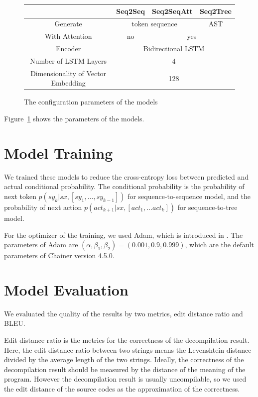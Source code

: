 \documentclass[senior,final,11pt]{iscs-thesis}
\begin{document}
\begin{figure}[h]
	\begin{tabular}{|c||c|c|c|}
		\hline
		  & Seq2Seq & Seq2SeqAtt & Seq2Tree \\ \hline \hline
		 Generate & \multicolumn{2}{|c|}{token sequence} & AST \\ \hline
		 With Attention & no & \multicolumn{2}{|c|}{yes} \\ \hline
		 Encoder & \multicolumn{3}{|c|}{Bidirectional LSTM} \\ \hline
		Number of LSTM Layers & \multicolumn{3}{|c|}{4} \\ \hline
		Dimensionality of Vector Embedding & \multicolumn{3}{|c|}{128} \\ \hline
	\end{tabular}
	\caption{The configuration parameters of the models}
	\label{fig:parameterofmodels}
\end{figure}

Figure~\ref{fig:parameterofmodels} shows the parameters of the models. 


\section{Model Training}
We trained these models to reduce the cross-entropy loss between predicted and actual conditional probability.
The conditional probability is the probability of next token $ p(sy_k|sx,[sy_1,\dots,sy_{k-1}]) $ for sequence-to-sequence model, 
and the probability of next action $p(act_{k+1}|sx,[act_1, \dots act_{k}]) $ for sequence-to-tree model.

For the optimizer of the training, we used Adam, which is introduced in \cite{Adam}.
The parameters of Adam are $ (\alpha,\beta_1,\beta_2) = (0.001,0.9,0.999) $, which are the default parameters of Chainer version 4.5.0.

\section{Model Evaluation}
We evaluated the quality of the results by two metrics, edit distance ratio and BLEU.

Edit distance ratio is the metrics for the correctness of the decompilation result.
Here, the edit distance ratio between two strings means the Levenshtein distance divided by the average length of the two strings.
Ideally, the correctness of the decompilation result should be measured by the distance of the meaning of the program.
However the decompilation result is usually uncompilable, so we used the edit distance of the source codes as the approximation of the correctness.
\end{document}
